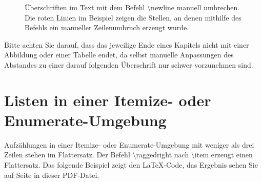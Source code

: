 
\begin{figure}[h]
	\caption{Überschriften im Text mit dem Befehl \glqq \textbackslash newline\grqq{} manuell umbrechen. Die roten Linien im Beispiel zeigen die Stellen, an denen mithilfe des Befehls ein manueller Zeilenumbruch erzeugt wurde.}
	\label{fig:ueberschrift-text-umbrechen}
\end{figure}

Bitte achten Sie darauf, dass das jeweilige Ende eines Kapitels nicht mit einer Abbildung oder einer Tabelle endet, da selbst manuelle Anpassungen des Abstandes zu einer darauf folgenden Überschrift nur schwer vorzunehmen sind.





\section{Listen in einer Itemize- oder Enumerate-Umgebung}
Aufzählungen in einer Itemize- oder Enumerate-Umgebung mit weniger als drei Zeilen stehen im Flattersatz. Der Befehl
\glqq \textbackslash raggedright\grqq{} nach \glqq \textbackslash item\grqq{} erzeugt einen Flattersatz. Das folgende Beispiel zeigt den \LaTeX-Code, das Ergebnis sehen Sie auf Seite \pageref{itm:BeispielItemize} in dieser PDF-Datei.

